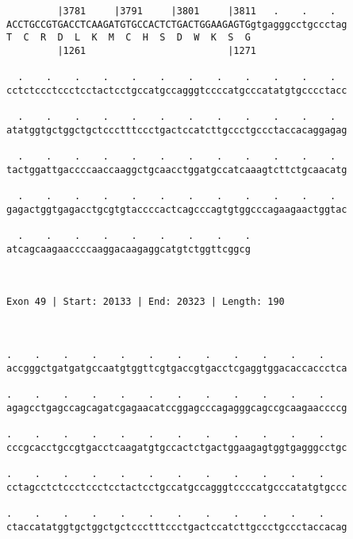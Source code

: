 \documentclass{article}
\begin{document}
\begin{Verbatim}
         |3781     |3791     |3801     |3811   .    .    .  
ACCTGCCGTGACCTCAAGATGTGCCACTCTGACTGGAAGAGTGgtgagggcctgccctag
T  C  R  D  L  K  M  C  H  S  D  W  K  S  G                 
         |1261                         |1271                
  
  .    .    .    .    .    .    .    .    .    .    .    .  
cctctccctccctcctactcctgccatgccagggtccccatgcccatatgtgcccctacc
                                                            
  .    .    .    .    .    .    .    .    .    .    .    .  
atatggtgctggctgctccctttccctgactccatcttgccctgccctaccacaggagag
                                                            
  .    .    .    .    .    .    .    .    .    .    .    .  
tactggattgaccccaaccaaggctgcaacctggatgccatcaaagtcttctgcaacatg
                                                            
  .    .    .    .    .    .    .    .    .    .    .    .  
gagactggtgagacctgcgtgtaccccactcagcccagtgtggcccagaagaactggtac
                                                            
  .    .    .    .    .    .    .    .    .
atcagcaagaaccccaaggacaagaggcatgtctggttcggcg
                                           
                                           
 
Exon 49 | Start: 20133 | End: 20323 | Length: 190



.    .    .    .    .    .    .    .    .    .    .    .    
accgggctgatgatgccaatgtggttcgtgaccgtgacctcgaggtggacaccaccctca
                                                            
.    .    .    .    .    .    .    .    .    .    .    .    
agagcctgagccagcagatcgagaacatccggagcccagagggcagccgcaagaaccccg
                                                            
.    .    .    .    .    .    .    .    .    .    .    .    
cccgcacctgccgtgacctcaagatgtgccactctgactggaagagtggtgagggcctgc
                                                            
.    .    .    .    .    .    .    .    .    .    .    .    
cctagcctctccctccctcctactcctgccatgccagggtccccatgcccatatgtgccc
                                                            
.    .    .    .    .    .    .    .    .    .    .    .    
ctaccatatggtgctggctgctccctttccctgactccatcttgccctgccctaccacag
                                                            

\end{Verbatim}
\end{document}
